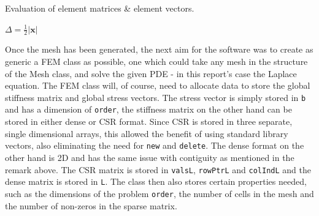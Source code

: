 \begin{algorithm}
	\caption{Evaluation of element matrices \& element vectors.}
	
	$\Delta = \frac{1}{2}\vert \mathbf{x} \vert$\\
	
	\label{algo:elems}
\end{algorithm}
Once the mesh has been generated, the next aim for the software was to create as generic a FEM class as possible, one which could take any mesh in the structure of the Mesh class, and solve the given PDE - in this report's case the Laplace equation. The FEM class will, of course, need to allocate data to store the global stiffness matrix and global stress vectors. The stress vector is simply stored in \texttt{b} and has a dimension of \texttt{order}, the stiffness matrix on the other hand can be stored in either dense or CSR format. Since CSR is stored in three separate, single dimensional arrays, this allowed the benefit of using standard library vectors, also eliminating the need for \texttt{new} and \texttt{delete}. The dense format on the other hand is 2D and has the same issue with contiguity as mentioned in the remark above. The CSR matrix is stored in \texttt{valsL}, \texttt{rowPtrL} and \texttt{colIndL} and the dense matrix is stored in \texttt{L}. The class then also stores certain properties needed, such as the dimensions of the problem \texttt{order}, the number of cells in the mesh and the number of non-zeros in the sparse matrix.

